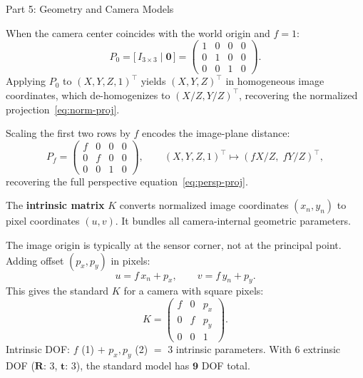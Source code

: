 \documentclass[letterpaper]{article}
\begin{document}
\begin{notes}{Part 5: Geometry and Camera Models}

When the camera center coincides with the world origin and $f = 1$:
\begin{equation}
  P_0 = \bigl[\,I_{3\times 3} \mid \mathbf{0}\,\bigr]
      = \begin{pmatrix}
          1 & 0 & 0 & 0 \\
          0 & 1 & 0 & 0 \\
          0 & 0 & 1 & 0
        \end{pmatrix}.
\end{equation}
Applying $P_0$ to $(X, Y, Z, 1)^\top$ yields $(X, Y, Z)^\top$ in homogeneous
image coordinates, which de-homogenizes to $(X/Z, Y/Z)^\top$, recovering
the normalized projection~\eqref{eq:norm-proj}.


Scaling the first two rows by $f$ encodes the image-plane distance:
\begin{equation}
  P_f = \begin{pmatrix}
    f & 0 & 0 & 0 \\
    0 & f & 0 & 0 \\
    0 & 0 & 1 & 0
  \end{pmatrix},
  \qquad
  (X,Y,Z,1)^\top \mapsto (fX/Z,\; fY/Z)^\top,
\end{equation}
recovering the full perspective equation~\eqref{eq:persp-proj}.


The \textbf{intrinsic matrix} $K$ converts normalized image coordinates
$(x_n, y_n)$ to pixel coordinates $(u, v)$.  It bundles all
camera-internal geometric parameters.


The image origin is typically at the sensor corner, not at the principal
point.  Adding offset $(p_x, p_y)$ in pixels:
\begin{equation}
  u = f\,x_n + p_x, \qquad v = f\,y_n + p_y.
\end{equation}
This gives the standard $K$ for a camera with square pixels:
\begin{equation}
  K = \begin{pmatrix}
    f   & 0 & p_x \\
    0   & f & p_y \\
    0   & 0 & 1
  \end{pmatrix}.
\end{equation}
Intrinsic DOF: $f$ (1) $+$ $p_x, p_y$ (2) $=$ 3 intrinsic parameters.
With 6 extrinsic DOF ($\mathbf{R}$: 3, $\mathbf{t}$: 3), the standard
model has $\mathbf{9}$ DOF total.


\end{notes}
\end{document}
